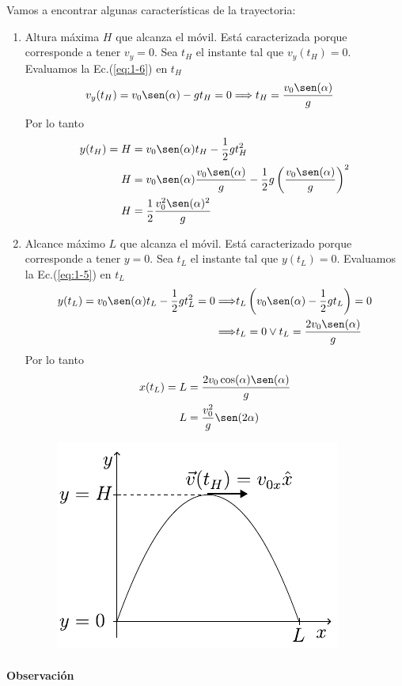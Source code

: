 \para
Vamos a encontrar algunas características de la trayectoria:
\begin{enumerate}
  \item Altura máxima $H$ que alcanza el móvil. Está caracterizada porque corresponde a tener $v_y = 0$.
  Sea $t_H$ el instante tal que $v_y(t_H) = 0$. Evaluamos la Ec.(\ref{eq:1-6}) en $t_H$
  \begin{align*}
    v_y(t_H) = v_0 \sen(\alpha) - gt_H &= 0 \Longrightarrow t_H = \frac{v_0 \sen(\alpha)}{g}
  \end{align*}
  Por lo tanto
  \begin{align*}
    y(t_H) = H &= v_0\sen(\alpha)t_H -\frac{1}{2}g t_H^2 \\
    H &= v_0\sen(\alpha)\frac{v_0 \sen(\alpha)}{g} -\frac{1}{2}g \left(\frac{v_0 \sen(\alpha)}{g}\right)^2 \\
    H &= \frac{1}{2}\frac{v_0^2\sen(\alpha)^2}{g}
  \end{align*}
  \item Alcance máximo $L$ que alcanza el móvil. Está caracterizado porque corresponde a tener $y = 0$. Sea $t_L$ el 
  instante tal que $y(t_L) = 0$. Evaluamos la Ec.(\ref{eq:1-5}) en $t_L$
  \begin{align*}
    y(t_L) = v_0\sen(\alpha)t_L -\frac{1}{2}g t_L^2 = 0 
    \Longrightarrow &t_L \left(v_0\sen(\alpha) -\frac{1}{2}g t_L \right) = 0 \\ 
    \Longrightarrow &t_L = 0 \lor t_L = \frac{2v_0 \sen(\alpha)}{g}
  \end{align*}
  Por lo tanto
  \begin{align*}
    x(t_L) = L &= \frac{2 v_0 \cos(\alpha) \sen(\alpha)}{g} \\
    L &= \frac{v_0^2}{g}\sen(2\alpha)         
  \end{align*}

  \begin{figure}[htbp]
    \centering
    \includegraphics[]{images/f1-20.pdf}
    \caption{}
    \label{fig:1-20}
  \end{figure}
\end{enumerate}

\paragraph{Observación}
